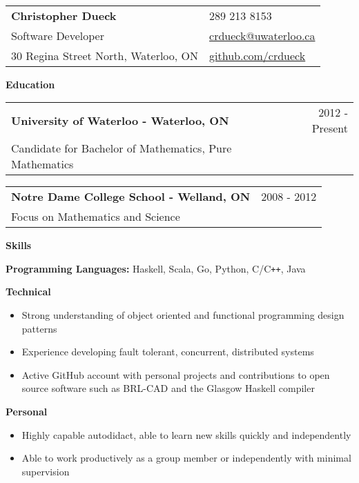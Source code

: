 \documentclass[10pt]{article}
\makeatletter
\newcommand{\resheader}[6]{\
\begin{tabular*}{7in}{l@{\extracolsep{\fill}}l}
    \textbf{\huge #1} & {\large #2}
    \vspace{4pt} \\
    {\large #3} & {\large #4}
    \vspace{4pt} \\
    {\large #5} & {\large #6}
\end{tabular*}\vspace{4pt}}
\newcommand{\resheading}[1]{{\large \colorbox{headercol}{\begin{minipage}{\textwidth}{\textbf{#1 \vphantom{p\^{E}}}}\end{minipage}}}}
\newcommand{\ressubheading}[3]{\item
\begin{tabular*}{7in}{l@{\extracolsep{\fill}}r}
    \textbf{#1} & #2 \\ #3
\end{tabular*}\vspace{-4pt}}
\newcommand{\resitem}[2]{\item{\textbf{#1} #2}}
\newcommand{\phone}{{\Large\faPhone} 289 213 8153}
\newcommand{\email}{{\Large\faEnvelope} \href{mailto:crdueck@uwaterloo.ca}{crdueck@uwaterloo.ca}}
\newcommand{\github}{{\Large\faGithub} \href{https://github.com/crdueck}{github.com/crdueck}}
\makeatother
\begin{document}
\resheader
    {Christopher Dueck}                    \phone
    {Software Developer}                   \email
    {30 Regina Street North, Waterloo, ON} \github

\resheading{Education}
\begin{description}
    \ressubheading{University of Waterloo - Waterloo, ON} {2012 - Present}
    {Candidate for Bachelor of Mathematics, Pure Mathematics}
    \ressubheading{Notre Dame College School - Welland, ON} {2008 - 2012}
    {Focus on Mathematics and Science}
\end{description}

\resheading{Skills}
\begin{description}
    \resitem{Programming Languages:} {Haskell, Scala, Go, Python, C/C\texttt{++}, Java}
    \resitem{Technical}{\vspace{-4pt}
    \begin{itemize}
            \item{Strong understanding of object oriented and functional programming design patterns}
            \item{Experience developing fault tolerant, concurrent, distributed systems}
            \item{Active GitHub account with personal projects and contributions to open source software such as BRL-CAD and the Glasgow Haskell compiler}
    \end{itemize}}
    \resitem{Personal}{\vspace{-4pt}
    \begin{itemize}
        \item{Highly capable autodidact, able to learn new skills quickly and independently}
        \item{Able to work productively as a group member or independently with minimal supervision}
    \end{itemize}}
\end{description}
\end{document}
